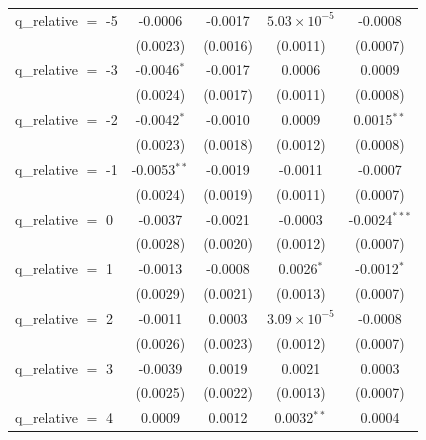 \begin{tabular}{lcccc}
   q\_relative $=$ -5   & -0.0006              & -0.0017             & $5.03\times 10^{-5}$      & -0.0008\\   
                        & (0.0023)             & (0.0016)            & (0.0011)                  & (0.0007)\\   
   q\_relative $=$ -3   & -0.0046$^{*}$        & -0.0017             & 0.0006                    & 0.0009\\   
                        & (0.0024)             & (0.0017)            & (0.0011)                  & (0.0008)\\   
   q\_relative $=$ -2   & -0.0042$^{*}$        & -0.0010             & 0.0009                    & 0.0015$^{**}$\\   
                        & (0.0023)             & (0.0018)            & (0.0012)                  & (0.0008)\\   
   q\_relative $=$ -1   & -0.0053$^{**}$       & -0.0019             & -0.0011                   & -0.0007\\   
                        & (0.0024)             & (0.0019)            & (0.0011)                  & (0.0007)\\   
   q\_relative $=$ 0    & -0.0037              & -0.0021             & -0.0003                   & -0.0024$^{***}$\\   
                        & (0.0028)             & (0.0020)            & (0.0012)                  & (0.0007)\\   
   q\_relative $=$ 1    & -0.0013              & -0.0008             & 0.0026$^{*}$              & -0.0012$^{*}$\\   
                        & (0.0029)             & (0.0021)            & (0.0013)                  & (0.0007)\\   
   q\_relative $=$ 2    & -0.0011              & 0.0003              & $3.09\times 10^{-5}$      & -0.0008\\   
                        & (0.0026)             & (0.0023)            & (0.0012)                  & (0.0007)\\   
   q\_relative $=$ 3    & -0.0039              & 0.0019              & 0.0021                    & 0.0003\\   
                        & (0.0025)             & (0.0022)            & (0.0013)                  & (0.0007)\\   
   q\_relative $=$ 4    & 0.0009               & 0.0012              & 0.0032$^{**}$             & 0.0004\\   

\end{tabular}
